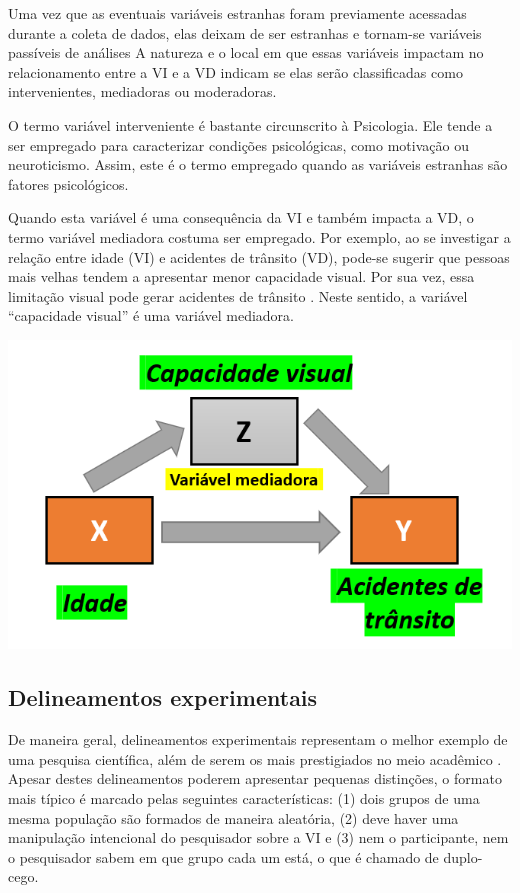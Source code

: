\documentclass[
]{book}
\begin{document}
Uma vez que as eventuais variáveis estranhas foram previamente acessadas durante a coleta de dados, elas deixam de ser estranhas e tornam-se variáveis passíveis de análises A natureza e o local em que essas variáveis impactam no relacionamento entre a VI e a VD indicam se elas serão classificadas como intervenientes, mediadoras ou moderadoras.

O termo variável interveniente é bastante circunscrito à Psicologia. Ele tende a ser empregado para caracterizar condições psicológicas, como motivação ou neuroticismo. Assim, este é o termo empregado quando as variáveis estranhas são fatores psicológicos.

Quando esta variável é uma consequência da VI e também impacta a VD, o termo variável mediadora costuma ser empregado. Por exemplo, ao se investigar a relação entre idade (VI) e acidentes de trânsito (VD), pode-se sugerir que pessoas mais velhas tendem a apresentar menor capacidade visual. Por sua vez, essa limitação visual pode gerar acidentes de trânsito \citep{Rhodes2011}. Neste sentido, a variável ``capacidade visual'' é uma variável mediadora.

\includegraphics{./img/cap_mediacao.png}

\hypertarget{delineamentos-experimentais}{%
\subsection{Delineamentos experimentais}\label{delineamentos-experimentais}}

De maneira geral, delineamentos experimentais representam o melhor exemplo de uma pesquisa científica, além de serem os mais prestigiados no meio acadêmico \citep{gil2002}. Apesar destes delineamentos poderem apresentar pequenas distinções, o formato mais típico é marcado pelas seguintes características: (1) dois grupos de uma mesma população são formados de maneira aleatória, (2) deve haver uma manipulação intencional do pesquisador sobre a VI e (3) nem o participante, nem o pesquisador sabem em que grupo cada um está, o que é chamado de duplo-cego.
\end{document}
